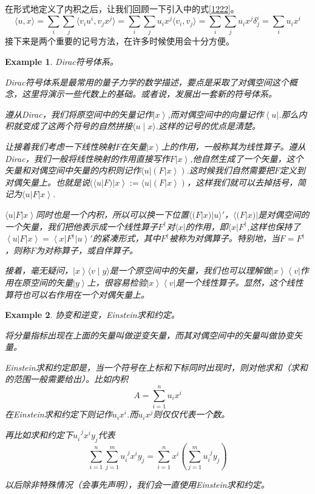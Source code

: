 \documentclass[11pt,a4paper,openany]{book}%
\theoremstyle{plain}%
\newtheorem{exa}{Example}[chapter]%
\newcommand{\bra}[1]{\left\langle #1\right|} %
\newcommand{\ket}[1]{\left| #1\right\rangle}
\newcommand{\braket}[2]{\langle #1 \mid #2 \rangle}
\begin{document}
在形式地定义了内积之后，让我们回顾一下引入中的式\eqref{1222}。
\[
\langle u,x \rangle=\sum_{i}\sum_{j}\langle v_iu^i,v_jx^j \rangle
=\sum_{i}\sum_{j}u_ix^j\langle v_i,v_j \rangle
=\sum_{i}\sum_{j}u_ix^j\delta_{j}^i=\sum_{i}u_ix^i
\]
\indent 接下来是两个重要的记号方法，在许多时候使用会十分方便。
\begin{exa}
Dirac符号体系。

Dirac符号体系是最常用的量子力学的数学描述，要点是采取了对偶空间这个概念，这里将演示一些代数上的基础。或者说，发展出一套新的符号体系。

遵从Dirac，我们将原空间中的矢量记作$\ket{x}$,而对偶空间中的向量记作$\bra{u}$.那么内积就变成了这两个符号的自然拼接$\braket{u}{x}$.这样的记号的优点是清楚。

让接着我们考虑一下线性映射$F$在矢量$\ket{x}$上的作用，一般称其为线性算子。遵从Dirac，我们一般将线性映射的作用直接写作$F\ket{x}$,他自然生成了一个矢量，这个矢量和对偶空间中矢量的内积则记作$\langle u|(F\ket{x})$.这时候我们自然需要把$F$定义到对偶矢量上。也就是说$(\langle u|F)\ket{x}:=\langle u|(F\ket{x})$，这样我们就可以去掉括号，简记为$\langle u|F\ket{x}$.

$\langle u|F\ket{x}$同时也是一个内积，所以可以换一下位置$\langle (F|x)|u \rangle'$，$\langle (F|x)|$是对偶空间的一个矢量，我们把他表示成一个线性算子$F^\dag$对$\langle x|$的作用，即$\langle x|F^\dag$,这样也保持了$\bra{u}F\ket{x}=\bra{x}F^\dag \ket{u}'$的紧凑形式，其中$F^\dag$被称为对偶算子。特别地，当$F=F^\dag$，则称$F$为对称算子，或自伴算子。

接着，毫无疑问，$\ket{x}\braket{v}{y}$是一个原空间中的矢量，我们也可以理解做$\ket{x} \bra{v}$作用在原空间的矢量$\ket{y}$上，很容易检验$\ket{x} \bra{v}$是一个线性算子。显然，这个线性算符也可以右作用在一个对偶矢量上。
\end{exa}
\begin{exa}
协变和逆变，Einstein求和约定。

将分量指标出现在上面的矢量叫做逆变矢量，而其对偶空间中的矢量叫做协变矢量。

Einstein求和约定即是，当一个符号在上标和下标同时出现时，则对他求和（求和的范围一般需要给出）。比如内积
\[
A=\sum_{i=1}^n u_ix^i
\]
在Einstein求和约定下则记作$u_ix^i$.而$u_ix^j$则仅仅代表一个数。

再比如求和约定下$u_{i}^{\,\,\,j}x^i y_j$代表
\[
\sum_{i=1}^n \sum_{j=1}^m u_{i}^{\phantom{i}j}x^i y_j=\sum_{i=1}^n x^i\left(\sum_{j=1}^m u_{i}^{\phantom{i}j} y_j\right)
\]

以后除非特殊情况（会事先声明），我们会一直使用Einstein求和约定。
\end{exa}
\end{document}
